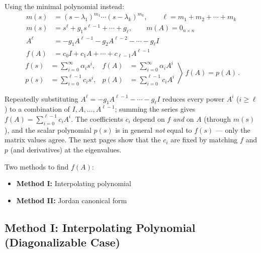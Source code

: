 Using the minimal polynomial instead:
\begin{align*}
m(s) &= (s-\lambda_1)^{m_1}\cdots(s-\lambda_k)^{m_k}, \qquad \ell = m_1 + m_2 + \cdots + m_k\\
m(s) &= s^\ell + g_1 s^{\ell-1} + \cdots + g_\ell, \qquad m(A) = 0_{n\times n}\\
A^\ell &= -g_1A^{\ell-1} - g_2A^{\ell-2} - \cdots - g_\ell I\\
f(A) &= c_0I + c_1A + \cdots + c_{\ell-1}A^{\ell-1}
\end{align*}
\[
\left.\begin{aligned}
f(s) &= \sum_{i=0}^{\infty}\alpha_i s^i, & f(A) &= \sum_{i=0}^{\infty}\alpha_i A^i\\
p(s) &= \sum_{i=0}^{\ell-1}c_i s^i, & p(A) &= \sum_{i=0}^{\ell-1}c_i A^i
\end{aligned}\right\rangle
\ \boxed{f(A) = p(A)}\,.
\]
\begin{insight}
Repeatedly substituting $A^\ell = -g_1A^{\ell-1}-\cdots-g_\ell I$ reduces every power $A^i$ ($i\geq\ell$) to a combination of $I,A,\dots,A^{\ell-1}$; summing the series gives $f(A)=\sum_{i=0}^{\ell-1}c_iA^i$. The coefficients $c_i$ depend on $f$ \emph{and} on $A$ (through $m(s)$), and the scalar polynomial $p(s)$ is in general \emph{not} equal to $f(s)$ --- only the matrix values agree. The next pages show that the $c_i$ are fixed by matching $f$ and $p$ (and derivatives) at the eigenvalues.
\end{insight}

Two methods to find $f(A)$:
\begin{itemize}[nosep]
\item \textbf{Method I:} Interpolating polynomial
\item \textbf{Method II:} Jordan canonical form
\end{itemize}

\subsection{Method I: Interpolating Polynomial (Diagonalizable Case)}\label{ss:method1-diag}
